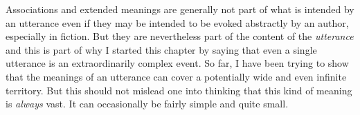 
Associations and extended meanings are generally not part of what is intended by an utterance even if they may be intended to be evoked abstractly by an author, especially in fiction. But they are nevertheless part of the content of the \emph{utterance} and this is part of why I started this chapter by saying that even a single utterance is an extraordinarily complex event. So far, I have been trying to show that the meanings of an utterance can cover a potentially wide and even infinite territory. But this should not mislead one into thinking that this kind of meaning is \emph{always} vast. It can occasionally be fairly simple and quite small.


